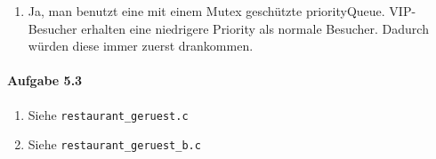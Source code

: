 \documentclass[11pt]{article}
\begin{document}
\begin{enumerate}[label=\alph*)]
\begin{lstlisting}[language=C]
void AnkunftWagen() {
	wait(wagenPlatz);
	fahreAufPlattform();
	oeffnetTueren();
	signal(besucherPlatz);
	signal(besucherPlatz);
	wait(besucherEingetreten);
	wait(besucherEingetreten);
	schliesseTueren();
	verlassePlattform();
	signal(wagenPlatz);
}
\end{lstlisting}

\begin{lstlisting}{language=C}
void AnkuftBesucher() {
	wait(besucherPlatz);
	betreteWagen();
	signal(besucherEingetreten);
}
\end{lstlisting}

\item Ja, man benutzt eine mit einem Mutex geschützte priorityQueue. VIP-Besucher erhalten eine niedrigere Priority als normale Besucher. Dadurch würden diese immer zuerst drankommen.

\end{enumerate}


\paragraph{Aufgabe 5.3}
\begin{enumerate}[label=\alph*)]
\item Siehe \verb|restaurant_geruest.c|
\item Siehe \verb|restaurant_geruest_b.c|
\end{enumerate}
\end{document}
